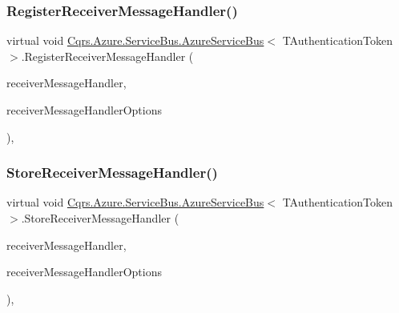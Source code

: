 \subsubsection{\texorpdfstring{Register\+Receiver\+Message\+Handler()}{RegisterReceiverMessageHandler()}}
{\footnotesize\ttfamily virtual void \hyperlink{classCqrs_1_1Azure_1_1ServiceBus_1_1AzureServiceBus}{Cqrs.\+Azure.\+Service\+Bus.\+Azure\+Service\+Bus}$<$ T\+Authentication\+Token $>$.Register\+Receiver\+Message\+Handler (\begin{DoxyParamCaption}\item[{Action$<$ Brokered\+Message $>$}]{receiver\+Message\+Handler,  }\item[{On\+Message\+Options}]{receiver\+Message\+Handler\+Options }\end{DoxyParamCaption})\hspace{0.3cm}{\ttfamily [protected]}, {\ttfamily [virtual]}}

\mbox{\label{classCqrs_1_1Azure_1_1ServiceBus_1_1AzureServiceBus_adae5c09b9b3123bd998e99b5b76e21e2}} 
\subsubsection{\texorpdfstring{Store\+Receiver\+Message\+Handler()}{StoreReceiverMessageHandler()}}
{\footnotesize\ttfamily virtual void \hyperlink{classCqrs_1_1Azure_1_1ServiceBus_1_1AzureServiceBus}{Cqrs.\+Azure.\+Service\+Bus.\+Azure\+Service\+Bus}$<$ T\+Authentication\+Token $>$.Store\+Receiver\+Message\+Handler (\begin{DoxyParamCaption}\item[{Action$<$ Brokered\+Message $>$}]{receiver\+Message\+Handler,  }\item[{On\+Message\+Options}]{receiver\+Message\+Handler\+Options }\end{DoxyParamCaption})\hspace{0.3cm}{\ttfamily [protected]}, {\ttfamily [virtual]}}

\mbox{\label{classCqrs_1_1Azure_1_1ServiceBus_1_1AzureServiceBus_ae4b736019e332a81eb08d3696f8b6e7e}} 
